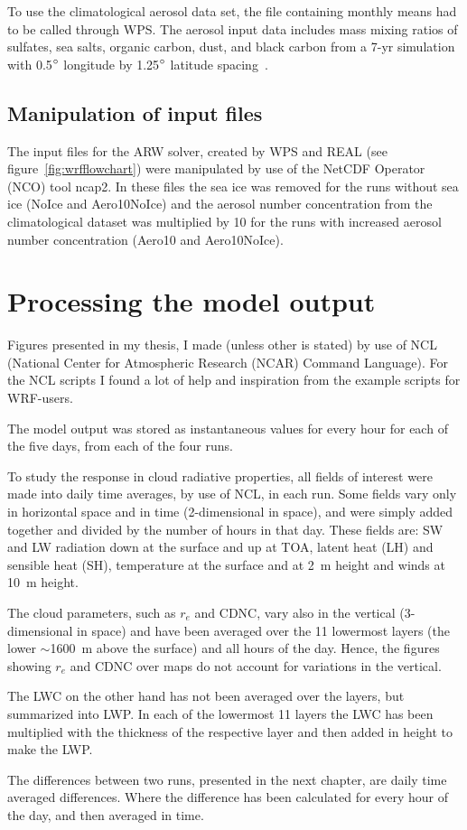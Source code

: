 To use the climatological aerosol data set, the file containing monthly means had to be called through WPS. The aerosol input data includes mass mixing ratios of sulfates, sea salts, organic carbon, dust, and black carbon from a 7-yr simulation with 0.5$\degree$ longitude by 1.25$\degree$ latitude spacing~\citep{Thompson2014}.

\subsection{Manipulation of input files}
The input files for the ARW solver, created by WPS and REAL (see figure~\ref{fig:wrfflowchart}) were manipulated by use of the NetCDF Operator (NCO) tool ncap2. In these files the sea ice was removed for the runs without sea ice (NoIce and Aero10NoIce) and the aerosol number concentration from the climatological dataset was multiplied by 10 for the runs with increased aerosol number concentration (Aero10 and Aero10NoIce).

\section{Processing the model output}
Figures presented in my thesis, I made (unless other is stated) by use of NCL (National Center for Atmospheric Research (NCAR) Command Language). For the NCL scripts I found a lot of help and inspiration from the example scripts for WRF-users.%

The model output was stored as instantaneous values for every hour for each of the five days, from each of the four runs. 

To study the response in cloud radiative properties, all fields of interest were made into daily time averages, by use of NCL, in each run. Some fields vary only in horizontal space and in time (2-dimensional in space), and were simply added together and divided by the number of hours in that day. These fields are: SW and LW radiation down at the surface and up at TOA, latent heat (LH) and sensible heat (SH), temperature at the surface and at 2~m height and winds at 10~m height.

The cloud parameters, such as $r_e$ and CDNC, vary also in the vertical (3-dimensional in space) and have been averaged over the 11 lowermost layers (the lower $\sim$1600~m above the surface) and all hours of the day. Hence, the figures showing $r_e$ and CDNC over maps do not account for variations in the vertical.

The LWC on the other hand has not been averaged over the layers, but summarized into LWP. In each of the lowermost 11 layers the LWC has been multiplied with the thickness of the respective layer and then added in height to make the LWP.

The differences between two runs, presented in the next chapter, are daily time averaged differences. Where the difference has been calculated for every hour of the day, and then averaged in time.